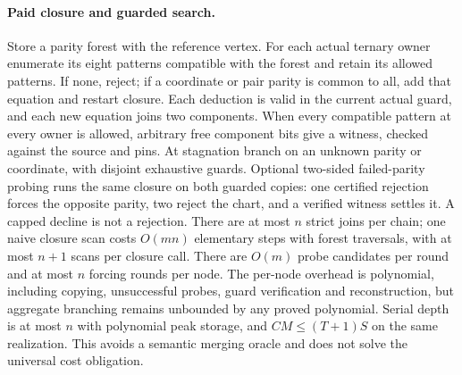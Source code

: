 \documentclass[11pt]{article}
\begin{document}
\paragraph{Paid closure and guarded search.}
Store a parity forest with the reference vertex. For each actual ternary owner enumerate its eight patterns compatible with the forest and retain its allowed patterns. If none, reject; if a coordinate or pair parity is common to all, add that equation and restart closure. Each deduction is valid in the current actual guard, and each new equation joins two components. When every compatible pattern at every owner is allowed, arbitrary free component bits give a witness, checked against the source and pins. At stagnation branch on an unknown parity or coordinate, with disjoint exhaustive guards. Optional two-sided failed-parity probing runs the same closure on both guarded copies: one certified rejection forces the opposite parity, two reject the chart, and a verified witness settles it. A capped decline is not a rejection. There are at most $n$ strict joins per chain; one naive closure scan costs $O(mn)$ elementary steps with forest traversals, with at most $n+1$ scans per closure call. There are $O(m)$ probe candidates per round and at most $n$ forcing rounds per node. The per-node overhead is polynomial, including copying, unsuccessful probes, guard verification and reconstruction, but aggregate branching remains unbounded by any proved polynomial. Serial depth is at most $n$ with polynomial peak storage, and $CM\le (T+1)S$ on the same realization. This avoids a semantic merging oracle and does not solve the universal cost obligation.
\end{document}
